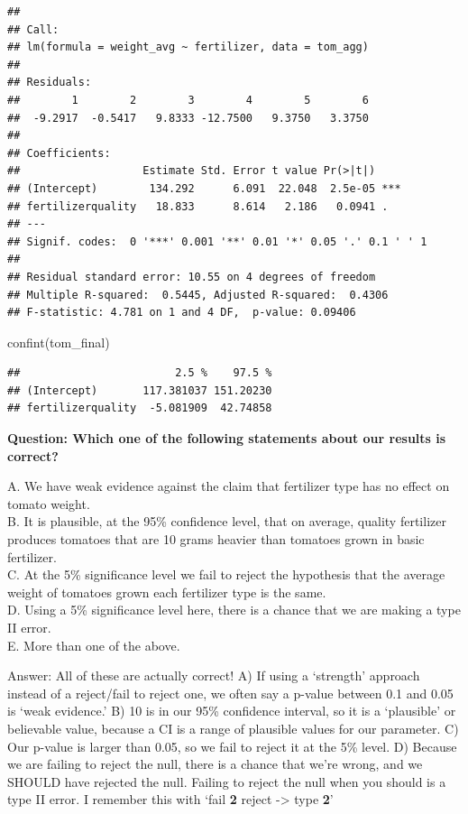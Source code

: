 \documentclass[
  openany]{book}
\newenvironment{Shaded}{\begin{snugshade}}{\end{snugshade}}
\newcommand{\FunctionTok}[1]{\textcolor[rgb]{0.00,0.00,0.00}{#1}}
\newcommand{\NormalTok}[1]{#1}
\begin{document}
\begin{verbatim}
## 
## Call:
## lm(formula = weight_avg ~ fertilizer, data = tom_agg)
## 
## Residuals:
##        1        2        3        4        5        6 
##  -9.2917  -0.5417   9.8333 -12.7500   9.3750   3.3750 
## 
## Coefficients:
##                   Estimate Std. Error t value Pr(>|t|)    
## (Intercept)        134.292      6.091  22.048  2.5e-05 ***
## fertilizerquality   18.833      8.614   2.186   0.0941 .  
## ---
## Signif. codes:  0 '***' 0.001 '**' 0.01 '*' 0.05 '.' 0.1 ' ' 1
## 
## Residual standard error: 10.55 on 4 degrees of freedom
## Multiple R-squared:  0.5445, Adjusted R-squared:  0.4306 
## F-statistic: 4.781 on 1 and 4 DF,  p-value: 0.09406
\end{verbatim}

\begin{Shaded}
\begin{Highlighting}[]
\FunctionTok{confint}\NormalTok{(tom\_final)}
\end{Highlighting}
\end{Shaded}

\begin{verbatim}
##                        2.5 %    97.5 %
## (Intercept)       117.381037 151.20230
## fertilizerquality  -5.081909  42.74858
\end{verbatim}

\textbf{Question: Which one of the following statements about our results is correct?}

A. We have weak evidence against the claim that fertilizer type has no effect on tomato weight.\\
B. It is plausible, at the 95\% confidence level, that on average, quality fertilizer produces tomatoes that are 10 grams heavier than tomatoes grown in basic fertilizer.\\
C. At the 5\% significance level we fail to reject the hypothesis that the average weight of tomatoes grown each fertilizer type is the same.\\
D. Using a 5\% significance level here, there is a chance that we are making a type II error.\\
E. More than one of the above.

Answer: All of these are actually correct! A) If using a `strength' approach instead of a reject/fail to reject one, we often say a p-value between 0.1 and 0.05 is `weak evidence.' B) 10 is in our 95\% confidence interval, so it is a `plausible' or believable value, because a CI is a range of plausible values for our parameter. C) Our p-value is larger than 0.05, so we fail to reject it at the 5\% level. D) Because we are failing to reject the null, there is a chance that we're wrong, and we SHOULD have rejected the null. Failing to reject the null when you should is a type II error. I remember this with `fail \textbf{2} reject -\textgreater{} type \textbf{2}'
\end{document}
